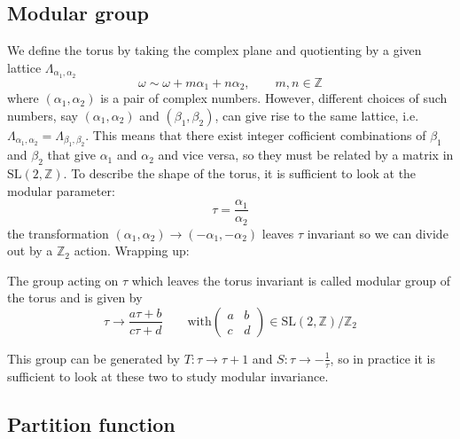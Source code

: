 \documentclass{article}
\begin{document}
\subsection{Modular group}
We define the torus by taking the complex plane and quotienting by a given lattice \( \Lambda_{\alpha_{1} , \alpha_{2}} \) 
\begin{displaymath}
	\omega \sim \omega + m \alpha_{1} + n \alpha_{2}, \qquad m,n \in \mathbb{Z}
\end{displaymath}
where \( ( \alpha_{1} , \alpha_{2}) \) is a pair of complex numbers. However, different choices of such numbers, say
\( (\alpha_{1}, \alpha_{2}) \) and \(( \beta_{1} , \beta_{2})\), can give rise to the same lattice, i.e. \( \Lambda_{\alpha_{1} , \alpha_{2}}
= \Lambda_{\beta_{1} , \beta_{2}}\). This means that there exist integer cofficient combinations of \( \beta_{1} \) and 
\(\beta_{2} \) that give \( \alpha_{1} \) and \( \alpha_{2} \) and vice versa, so they must be related by a
matrix in \( \text{SL}(2, \mathbb{Z} ) \).  To describe the shape 
of the torus, it is sufficient to look at the modular parameter:
\begin{equation}
	\tau = \frac{\alpha_{1}}{ \alpha_{2}} 
\end{equation}
the transformation \( ( \alpha_{1} , \alpha_{2} ) \to ( -\alpha_{1}, - \alpha_{2})  \) leaves \( \tau \) invariant
so we can divide out by a \( \mathbb{Z}_{2} \) action. Wrapping up:
\begin{mdframed}
	The group acting on \( \tau \) which leaves the torus invariant is called 
	modular group of the torus and is given by
\begin{equation}
	\tau \to \frac{a \tau + b}{c \tau + d}\qquad \text{with} 
	\begin{pmatrix}
		a & b\\ c & d 
	\end{pmatrix}
	\in \text{SL}(2, \mathbb{Z}) / \mathbb{Z}_{2} 
\end{equation}
\end{mdframed}
This group can be generated by \( T : \tau \to \tau + 1  \) and \( S : \tau \to - \frac{1}{\tau}  \), so in
practice it is sufficient to look at these two to study modular invariance.
\subsection{Partition function}
\end{document}
